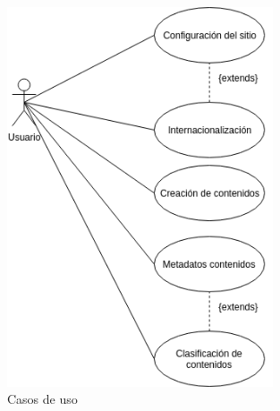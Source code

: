 \begin{figure}[h]
    \centering
    \includegraphics[width=0.7\textwidth]{4_analisis/casos_de_uso}
    \caption{Casos de uso}
    \label{fig:actores}
\end{figure}


